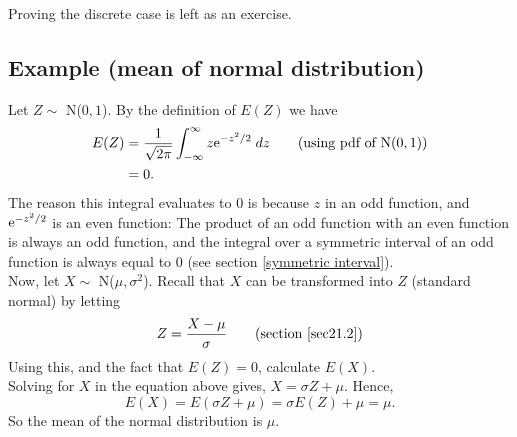 \noindent Proving the discrete case is left as an exercise.


\subsection{Example (mean of normal distribution)} \label{meanNormal}
Let $Z \sim$ N($0,1$). By the definition of $E(Z)$ we have
\begin{align*}
E(Z)  & = \frac{1}{\sqrt{2\pi}} \int_{-\infty}^\infty z\mathrm{e}^{-z^2/2} \; dz \tag{using pdf of N($0,1$)} \\
	& = 0.
\end{align*}
The reason this integral evaluates to $0$ is because $z$ in an odd function, and $\mathrm{e}^{-z^2/2}$ is an even function: The product of an odd function with an even function is always an odd function, and the integral over a symmetric interval of an odd function is always equal to 0 (see section \ref{symmetric interval}). \\

\noindent Now, let $X \sim$ N($\mu,\sigma^2$). Recall that $X$ can be transformed into $Z$ (standard normal) by letting
\[
Z = \frac{X - \mu}{\sigma} \tag{section \ref{sec21.2}}
\]
\noindent Using this, and the fact that $E(Z) = 0$, calculate $E(X)$. \\

\solution
Solving for $X$ in the equation above gives, $X = \sigma Z + \mu$. Hence,
\[
E(X) = E(\sigma Z + \mu) = \sigma E(Z) + \mu = \mu. \tag{since $E(Z) = 0$}
\]
So the mean of the normal distribution is $\mu$.






